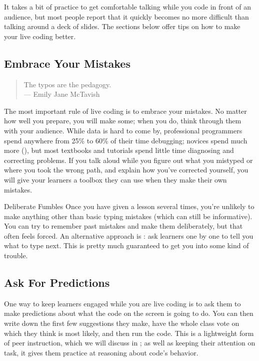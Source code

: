 It takes a bit of practice to get comfortable
talking while you code in front of an audience,
but most people report that it quickly becomes no more difficult than talking around a deck of slides.
The sections below offer tips on how to make your live coding better.

\subsection*{Embrace Your Mistakes}

\begin{quote}

  The typos are the pedagogy. \\
  --- Emily Jane McTavish

\end{quote}

The most important rule of live coding is to embrace your mistakes.
No matter how well you prepare,
you will make some;
when you do,
think through them with your audience.
While data is hard to come by,
professional programmers spend anywhere from 25\% to 60\% of their time debugging;
novices spend much more (),
but most textbooks and tutorials spend little time diagnosing and correcting problems.
If you talk aloud while you figure out what you mistyped
or where you took the wrong path,
and explain how you've corrected yourself,
you will give your learners a toolbox they can use when they make their own mistakes.

\begin{aside}{Deliberate Fumbles}
  Once you have given a lesson several times,
  you're unlikely to make anything other than basic typing mistakes
  (which can still be informative).
  You can try to remember past mistakes and make them deliberately,
  but that often feels forced.
  An alternative approach is :
  ask learners one by one to tell you what to type next.
  This is pretty much guaranteed to get you into some kind of trouble.
\end{aside}

\subsection*{Ask For Predictions}

One way to keep learners engaged while you are live coding
is to ask them to make predictions about what the code on the screen is going to do.
You can then write down the first few suggestions they make,
have the whole class vote on which they think is most likely,
and then run the code.
This is a lightweight form of peer instruction,
which we will discuss in ;
as well as keeping their attention on task,
it gives them practice at reasoning about code's behavior.

